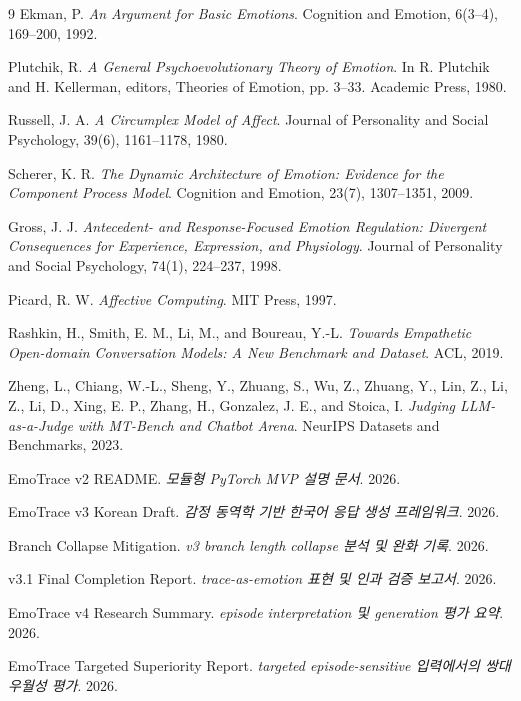 ﻿\documentclass[11pt,a4paper]{article}
\begin{document}
\begin{thebibliography}{9}
Ekman, P. \textit{An Argument for Basic Emotions}. Cognition and Emotion, 6(3--4), 169--200, 1992.

Plutchik, R. \textit{A General Psychoevolutionary Theory of Emotion}. In R. Plutchik and H. Kellerman, editors, Theories of Emotion, pp. 3--33. Academic Press, 1980.

Russell, J. A. \textit{A Circumplex Model of Affect}. Journal of Personality and Social Psychology, 39(6), 1161--1178, 1980.

Scherer, K. R. \textit{The Dynamic Architecture of Emotion: Evidence for the Component Process Model}. Cognition and Emotion, 23(7), 1307--1351, 2009.

Gross, J. J. \textit{Antecedent- and Response-Focused Emotion Regulation: Divergent Consequences for Experience, Expression, and Physiology}. Journal of Personality and Social Psychology, 74(1), 224--237, 1998.

Picard, R. W. \textit{Affective Computing}. MIT Press, 1997.

Rashkin, H., Smith, E. M., Li, M., and Boureau, Y.-L. \textit{Towards Empathetic Open-domain Conversation Models: A New Benchmark and Dataset}. ACL, 2019.

Zheng, L., Chiang, W.-L., Sheng, Y., Zhuang, S., Wu, Z., Zhuang, Y., Lin, Z., Li, Z., Li, D., Xing, E. P., Zhang, H., Gonzalez, J. E., and Stoica, I. \textit{Judging LLM-as-a-Judge with MT-Bench and Chatbot Arena}. NeurIPS Datasets and Benchmarks, 2023.

EmoTrace v2 README. \textit{모듈형 PyTorch MVP 설명 문서}. 2026.

EmoTrace v3 Korean Draft. \textit{감정 동역학 기반 한국어 응답 생성 프레임워크}. 2026.

Branch Collapse Mitigation. \textit{v3 branch length collapse 분석 및 완화 기록}. 2026.

v3.1 Final Completion Report. \textit{trace-as-emotion 표현 및 인과 검증 보고서}. 2026.

EmoTrace v4 Research Summary. \textit{episode interpretation 및 generation 평가 요약}. 2026.

EmoTrace Targeted Superiority Report. \textit{targeted episode-sensitive 입력에서의 쌍대 우월성 평가}. 2026.
\end{thebibliography}
\end{document}
